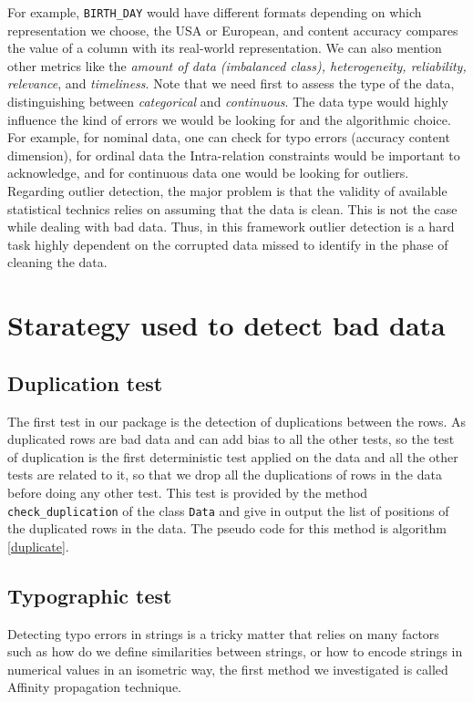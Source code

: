 \documentclass{article}
\begin{document}
For example, \texttt{BIRTH\_DAY} would have different formats depending on which representation we choose, the USA or European, and content accuracy compares the value of a column with its real-world representation.
We can also mention other metrics like the \textit{amount of data (imbalanced class), heterogeneity, reliability, relevance}, and \textit{timeliness}.
Note that we need first to assess the type of the data, distinguishing between \textit{categorical} and \textit{continuous}.
The data type would highly influence the kind of errors we would be looking for and the algorithmic choice.
For example, for nominal data, one can check for typo errors (accuracy content dimension), for ordinal data the Intra-relation constraints would be important to acknowledge, and for continuous data one would be looking for outliers.
Regarding outlier detection, the major problem is that the validity of available statistical technics relies on assuming that the data is clean.
This is not the case while dealing with bad data.
Thus, in this framework outlier detection is a hard task highly dependent on the corrupted data missed to identify in the phase of cleaning the data.
\section{Starategy used to detect bad data}
\label{sec:Starategy used to detect bad data}


\subsection{Duplication test} %
\label{sub:Duplication test}
The first test in our package is the detection of duplications between the rows.  As duplicated rows are bad data and can add bias to all the other tests, so the test of duplication is the first deterministic test applied on the data and all the other tests are related to it, so that we drop all the duplications of rows in the data before doing any other test. This test is provided by the method \texttt{check\_duplication} of the class \texttt{Data} and give in output the list of positions of the duplicated rows in the data. The pseudo code for this method is algorithm \ref{duplicate}.



\subsection{Typographic test} %
\label{sub:Typographic test}
Detecting typo errors in strings is a tricky matter that relies on many factors such as how do we define similarities between strings, or how to encode strings in numerical values in an isometric way, the first method we investigated is called Affinity propagation technique.
\end{document}

